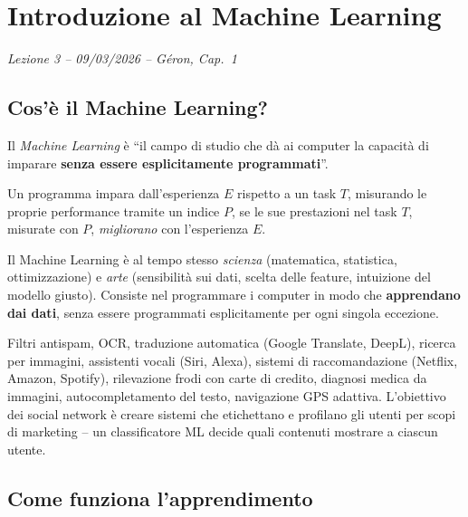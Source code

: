 \chapter{Introduzione al Machine Learning}
\begin{flushright}\small\textit{Lezione 3 -- 09/03/2026 -- G\'eron, Cap.\ 1}\end{flushright}

\section{Cos'è il Machine Learning?}

\begin{defbox}
Il \emph{Machine Learning} è ``il campo di studio che dà ai computer la capacità di imparare \textbf{senza essere esplicitamente programmati}''.
\end{defbox}

\begin{defbox}
Un programma impara dall'esperienza $E$ rispetto a un task $T$, misurando le proprie performance tramite un indice $P$, se le sue prestazioni nel task $T$, misurate con $P$, \emph{migliorano} con l'esperienza $E$.
\end{defbox}

Il Machine Learning è al tempo stesso \emph{scienza} (matematica, statistica, ottimizzazione) e \emph{arte} (sensibilità sui dati, scelta delle feature, intuizione del modello giusto). Consiste nel programmare i computer in modo che \textbf{apprendano dai dati}, senza essere programmati esplicitamente per ogni singola eccezione.

\begin{exbox}
Filtri antispam, OCR, traduzione automatica (Google Translate, DeepL), ricerca per immagini, assistenti vocali (Siri, Alexa), sistemi di raccomandazione (Netflix, Amazon, Spotify), rilevazione frodi con carte di credito, diagnosi medica da immagini, autocompletamento del testo, navigazione GPS adattiva. L'obiettivo dei social network è creare sistemi che etichettano e profilano gli utenti per scopi di marketing -- un classificatore ML decide quali contenuti mostrare a ciascun utente.
\end{exbox}

\section{Come funziona l'apprendimento}

